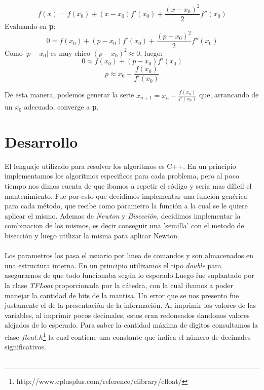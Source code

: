 \documentclass[a4paper]{article}
\begin{document}
$$f(x) = f(x_0) + (x - x_0)f'(x_0) + \frac{(x - x_0)^2}{2}f''(x_0)$$
Evaluando en \textbf{p}:
$$0 = f(x_0) + (p - x_0)f'(x_0) + \frac{(p - x_0)^2}{2}f''(x_0)$$
Como  $|p - x_0|$ es muy chico $(p - x_0)^2 \approx 0$, luego:  
$$0 \approx f(x_0) + (p - x_0)f'(x_0)$$
$$p \approx x_0 - \frac{f(x_0)}{f'(x_0)}$$

De esta manera, podemos generar la serie $x_{n + 1} = x_n - \frac{f(x_n)}{f'(x_n)}$ que, arrancando de un $x_0$ adecuado, converge a \textbf{p}.

\newpage

\section{Desarrollo}
El lenguaje utilizado para resolver los algoritmos es C++. En un principio implementamos los algoritmos especificos para cada problema, pero al poco tiempo nos dimos cuenta de que ibamos a repetir el código y sería mas díficil el mantenimiento.   
Fue por esto que decidimos implementar una función genérica para cada método, que recibe como parametro la función a la cual se le quiere aplicar el mismo. Ademas de \textit{Newton} y \textit{Bisección}, decidimos implementar la combinacion de los mismos, es decir conseguir una 'semilla' con el metodo de bisección y luego utilizar la misma para aplicar Newton.\\\\

Los parametros los pasa el usuario por linea de comandos y son almacenados en una estructura interna.  
En un principio utilizamos el tipo \textit{double} para asegurarnos de que todo funcionaba según lo esperado.Luego fue suplantado por la clase \textit{TFLoat} proporcionada por la cátedra, con la cual ibamos a poder manejar la cantidad de bits de la mantisa.   
Un error que se nos presento fue justamente el de la presentación de la información. Al imprimir los valores de las variables, al imprimir pocos decimales, estos eran redoneados dandonos valores alejados de lo esperado. Para saber la cantidad máxima de digitos consultamos la clase $float.h$\footnote{http://www.cplusplus.com/reference/clibrary/cfloat/} la cual contiene una constante que indica el número de decimales significativos. \\\\
\end{document}
